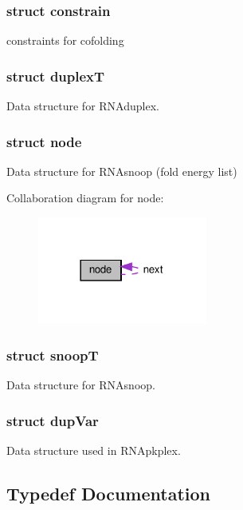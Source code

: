 \subsubsection{struct constrain}
constraints for cofolding \label{structduplexT}
\subsubsection{struct duplexT}
Data structure for R\+N\+Aduplex. \label{structnode}
\subsubsection{struct node}
Data structure for R\+N\+Asnoop (fold energy list) 

Collaboration diagram for node\+:
\nopagebreak
\begin{figure}[H]
\begin{center}
\leavevmode
\includegraphics[width=158pt]{structnode__coll__graph}
\end{center}
\end{figure}
\label{structsnoopT}
\subsubsection{struct snoopT}
Data structure for R\+N\+Asnoop. \label{structdupVar}
\subsubsection{struct dup\+Var}
Data structure used in R\+N\+Apkplex. 

\subsection{Typedef Documentation}
\mbox{\label{group__data__structures_ga4381025ffbd692e54189b2c679c79c99}} 
